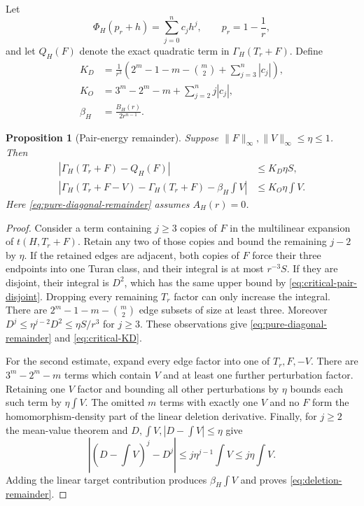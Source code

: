 \documentclass[11pt]{article}
\newtheorem{proposition}[theorem]{Proposition}
\begin{document}
Let
\[
 \Phi_H(p_r+h)=\sum_{j=0}^n c_jh^j,
 \qquad p_r=1-\frac1r,
\]
and let $Q_H(F)$ denote the exact quadratic term in
$\Gamma_H(T_r+F)$.  Define
\begin{align}
 K_D&=\frac1{r^3}\left(
 2^m-1-m-\binom m2+\sum_{j=3}^n|c_j|
 \right),
 \label{eq:critical-KD}\\
 K_O&=3^m-2^m-m+\sum_{j=2}^n j|c_j|,
 \label{eq:critical-KO}\\
 \beta_H&=\frac{B_H(r)}{2r^{n-1}}.
 \label{eq:critical-beta}
\end{align}

\begin{proposition}[Pair-energy remainder]
\label{prop:critical-pair-remainder}
Suppose $\lVert F\rVert_\infty,\lVert V\rVert_\infty\leq\eta\leq1$.
Then
\begin{align}
 \left|\Gamma_H(T_r+F)-Q_H(F)\right|
 &\leq K_D\eta S,
 \label{eq:pure-diagonal-remainder}\\
 \left|\Gamma_H(T_r+F-V)-\Gamma_H(T_r+F)-\beta_H\int V\right|
 &\leq K_O\eta\int V.
 \label{eq:deletion-remainder}
\end{align}
Here \eqref{eq:pure-diagonal-remainder} assumes $A_H(r)=0$.
\end{proposition}

\begin{proof}
Consider a term containing $j\geq3$ copies of $F$ in the multilinear
expansion of $t(H,T_r+F)$.  Retain any two of those copies and bound the
remaining $j-2$ by $\eta$.  If the retained edges are adjacent, both copies
of $F$ force their three endpoints into one Turan class, and their integral
is at most $r^{-3}S$.  If they are disjoint, their integral is $D^2$, which
has the same upper bound by \eqref{eq:critical-pair-disjoint}.  Dropping every
remaining $T_r$ factor can only increase the integral.  There are
$2^m-1-m-\binom m2$ edge subsets of size at least three.  Moreover
$D^j\leq\eta^{j-2}D^2\leq\eta S/r^3$ for $j\geq3$.  These observations give
\eqref{eq:pure-diagonal-remainder} and \eqref{eq:critical-KD}.

For the second estimate, expand every edge factor into one of $T_r,F,-V$.
There are $3^m-2^m-m$ terms which contain $V$ and at least one further
perturbation factor.  Retaining one $V$ factor and bounding all other
perturbations by $\eta$ bounds each such term by $\eta\int V$.  The omitted
$m$ terms with exactly one $V$ and no $F$ form the homomorphism-density part
of the linear deletion derivative.  Finally, for $j\geq2$ the mean-value
theorem and $D,\int V,|D-\int V|\leq\eta$ give
\[
 \left|(D-\textstyle\int V)^j-D^j\right|
 \leq j\eta^{j-1}\int V
 \leq j\eta\int V.
\]
Adding the linear target contribution produces $\beta_H\int V$ and proves
\eqref{eq:deletion-remainder}.
\end{proof}
\end{document}

